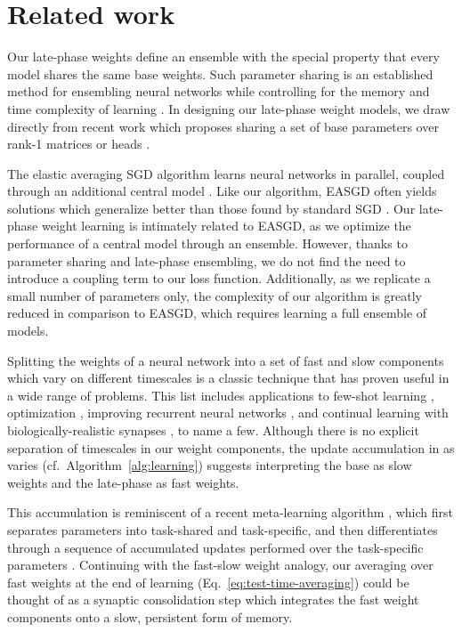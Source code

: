\documentclass{article} \usepackage{iclr2021_conference,times}
\begin{document}
\section{Related work}
Our late-phase weights define an ensemble with the special property that every model shares the same base weights. Such parameter sharing is an established method for ensembling neural networks while controlling for the memory and time complexity of learning \citep{lee_why_2015}. In designing our late-phase weight models, we draw directly from recent work which proposes sharing a set of base parameters over  rank-1 matrices \citep{wen_batchensemble_2020} or  heads \citep{lee_why_2015}.


The elastic averaging SGD algorithm learns  neural networks in parallel, coupled through an additional central model \citep[EASGD;][]{zhang_deep_2015}. Like our algorithm, EASGD often yields solutions which generalize better than those found by standard SGD \citep{pittorino_entropic_2020}. Our late-phase weight learning is intimately related to EASGD, as we optimize the performance of a central model through an ensemble. However, thanks to parameter sharing and late-phase ensembling, we do not find the need to introduce a coupling term to our loss function. Additionally, as we replicate a small number of parameters only, the complexity of our algorithm is greatly reduced in comparison to EASGD, which requires learning a full ensemble of models.


Splitting the weights of a neural network into a set of fast and slow components which vary on different timescales is a classic technique \citep{hinton_using_1987,schmidhuber_learning_1992} that has proven useful in a wide range of problems. This list includes applications to few-shot learning \citep{munkhdalai_meta_2017,nichol_first-order_2018,perez_film_2018,zintgraf_fast_2019,flennerhag_meta-learning_2020}, optimization \citep{zhang_lookahead_2019,chaudhari_entropy-sgd_2019}, improving recurrent neural networks \citep{ba_using_2016,ha_hypernetworks_2017}, and continual learning with biologically-realistic synapses \citep{kaplanis_continual_2018,leimer_synaptic_2019}, to name a few. Although there is no explicit separation of timescales in our weight components, the update accumulation in  as  varies (cf.~Algorithm~\ref{alg:learning}) suggests interpreting the base  as slow weights and the late-phase  as fast weights. 

This accumulation is reminiscent of a recent meta-learning algorithm \citep{zintgraf_fast_2019}, which first separates parameters into task-shared and task-specific, and then differentiates through a sequence of accumulated updates performed over the task-specific parameters \citep{finn_model-agnostic_2017}. Continuing with the fast-slow weight analogy, our averaging over fast weights at the end of learning (Eq.~\ref{eq:test-time-averaging}) could be thought of as a synaptic consolidation step which integrates the fast weight components onto a slow, persistent form of memory.
\end{document}
